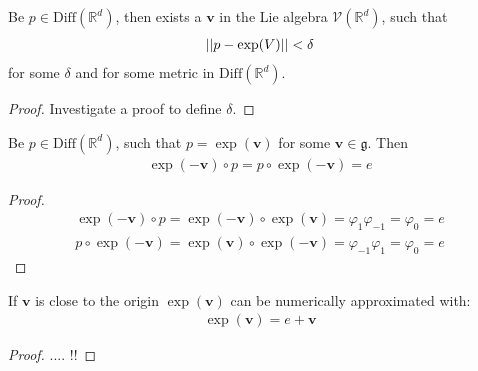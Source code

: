 \begin{lemma}[existence]\label{le:existencelemma}
	Be $p \in \text{Diff}(\mathbb{R}^{d})$, then exists a $\mathbf{v}$ in the Lie algebra $\mathcal{V}(\mathbb{R}^{d})$, such that 
	\begin{align*}
	\vert\lvert p - \exp(V) \rvert\vert < \delta
	\end{align*}
	for some $\delta$ and for some metric in $\text{Diff}(\mathbb{R}^{d})$.
\end{lemma}
\begin{proof}
	Investigate a proof to define $\delta$.
\end{proof}
%
\begin{lemma}\label{le:idlemma}
	Be $p\in \text{Diff}(\mathbb{R}^{d})$, such that $p= \exp(\mathbf{v} )$ for some $\mathbf{v} \in\mathfrak{g}$. Then
	\begin{align*}
	\exp(-\mathbf{v} )\circ p = p \circ \exp(-\mathbf{v} ) = e
	\end{align*}
\end{lemma}
\begin{proof}
	\begin{align*}
	\exp(-\mathbf{v})\circ p = \exp(-\mathbf{v})\circ \exp(\mathbf{v}) =  \varphi_{1}\varphi_{-1} = \varphi_{0} = e \\
	p \circ \exp(-\mathbf{v}) = \exp(\mathbf{v})\circ \exp(-\mathbf{v}) =  \varphi_{-1}\varphi_{1} = \varphi_{0} = e
	\end{align*}
\end{proof}
%

\begin{prop}\label{le:taylorlemma}
	If $\mathbf{v} $ is close to the origin $\exp(\mathbf{v} )$ can be numerically approximated with:
	\begin{align*}
	\exp(\mathbf{v} ) = e + \mathbf{v} 
	\end{align*}
\end{prop}
\begin{proof}
	.... !!
\end{proof}



